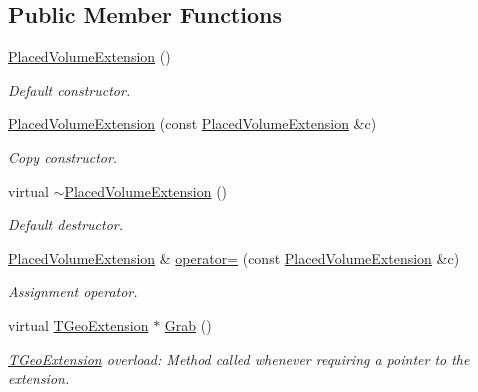 \subsection*{Public Member Functions}
\begin{DoxyCompactItemize}
\item 
\hyperlink{class_d_d4hep_1_1_geometry_1_1_placed_volume_extension_a6c84f8e08ebab9beb999c827056b3f4d}{PlacedVolumeExtension} ()
\begin{DoxyCompactList}\small\item\em Default constructor. \item\end{DoxyCompactList}\item 
\hyperlink{class_d_d4hep_1_1_geometry_1_1_placed_volume_extension_ae6ed2e13f9d86072e773573b7d710e1b}{PlacedVolumeExtension} (const \hyperlink{class_d_d4hep_1_1_geometry_1_1_placed_volume_extension}{PlacedVolumeExtension} \&c)
\begin{DoxyCompactList}\small\item\em Copy constructor. \item\end{DoxyCompactList}\item 
virtual \hyperlink{class_d_d4hep_1_1_geometry_1_1_placed_volume_extension_a99c666d418ebb75722ab794442169d72}{$\sim$PlacedVolumeExtension} ()
\begin{DoxyCompactList}\small\item\em Default destructor. \item\end{DoxyCompactList}\item 
\hyperlink{class_d_d4hep_1_1_geometry_1_1_placed_volume_extension}{PlacedVolumeExtension} \& \hyperlink{class_d_d4hep_1_1_geometry_1_1_placed_volume_extension_a946b4a4989ea4116a396dffd3886dbd0}{operator=} (const \hyperlink{class_d_d4hep_1_1_geometry_1_1_placed_volume_extension}{PlacedVolumeExtension} \&c)
\begin{DoxyCompactList}\small\item\em Assignment operator. \item\end{DoxyCompactList}\item 
virtual \hyperlink{class_t_geo_extension}{TGeoExtension} $\ast$ \hyperlink{class_d_d4hep_1_1_geometry_1_1_placed_volume_extension_aa5261b49a18fba980e00d96161db3855}{Grab} ()
\begin{DoxyCompactList}\small\item\em \hyperlink{class_t_geo_extension}{TGeoExtension} overload: Method called whenever requiring a pointer to the extension. \item\end{DoxyCompactList}\item 

\end{DoxyCompactItemize}
